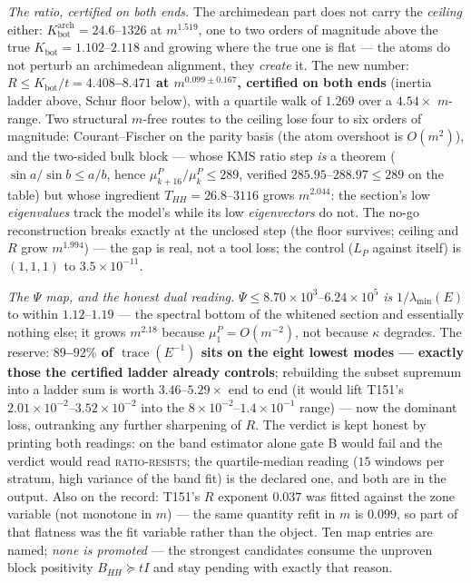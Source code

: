 \documentclass[11pt,a4paper]{article}
\begin{document}
\emph{The ratio, certified on both ends.} The archimedean part does not carry the
\emph{ceiling} either: $K^{\mathrm{arch}}_{\mathrm{bot}}=24.6$--$1326$ at $m^{1.519}$, one
to two orders of magnitude above the true $K_{\mathrm{bot}}=1.102$--$2.118$ and growing
where the true one is flat --- the atoms do not perturb an archimedean alignment, they
\emph{create} it. The new number: \textbf{$R\le K_{\mathrm{bot}}/t=4.408$--$8.471$ at
$m^{0.099\pm0.167}$, certified on both ends} (inertia ladder above, Schur floor below), with
a quartile walk of $1.269$ over a $4.54\times$ $m$-range. Two structural $m$-free routes to
the ceiling lose four to six orders of magnitude: Courant--Fischer on the parity basis (the
atom overshoot is $O(m^{2})$), and the two-sided bulk block --- whose KMS ratio step \emph{is}
a theorem ($\sin a/\sin b\le a/b$, hence $\mu^P_{k+16}/\mu^P_k\le289$, verified
$285.95$--$288.97\le289$ on the table) but whose ingredient $T_{HH}=26.8$--$3116$ grows
$m^{2.044}$: the section's low \emph{eigenvalues} track the model's while its low
\emph{eigenvectors} do not. The no-go reconstruction breaks exactly at the unclosed step
(the floor survives; ceiling and $R$ grow $m^{1.994}$) --- the gap is real, not a tool loss;
the control ($L_P$ against itself) is $(1,1,1)$ to $3.5\times10^{-11}$.

\emph{The $\Psi$ map, and the honest dual reading.} $\Psi\le8.70\times10^{3}$--$6.24\times
10^{5}$ \emph{is} $1/\lambda_{\min}(E)$ to within $1.12$--$1.19$ --- the spectral bottom of
the whitened section and essentially nothing else; it grows $m^{2.18}$ because
$\mu^P_1=O(m^{-2})$, not because $\kappa$ degrades. The reserve: \textbf{$89$--$92\%$ of
$\operatorname{trace}(E^{-1})$ sits on the eight lowest modes --- exactly those the
certified ladder already controls}; rebuilding the subset supremum into a ladder sum is
worth $3.46$--$5.29\times$ end to end (it would lift T151's
$2.01\times10^{-2}$--$3.52\times10^{-2}$ into the
$8\times10^{-2}$--$1.4\times10^{-1}$ range) --- now the dominant loss, outranking any
further sharpening of $R$. The verdict is kept honest by printing both readings: on the
band estimator alone gate B would fail and the verdict would read \textsc{ratio-resists};
the quartile-median reading ($15$ windows per stratum, high variance of the band fit) is the
declared one, and both are in the output. Also on the record: T151's $R$ exponent $0.037$
was fitted against the zone variable (not monotone in $m$) --- the same quantity refit in
$m$ is $0.099$, so part of that flatness was the fit variable rather than the object. Ten
map entries are named; \emph{none is promoted} --- the strongest candidates consume the
unproven block positivity $B_{HH}\succeq tI$ and stay pending with exactly that reason.
\end{document}
